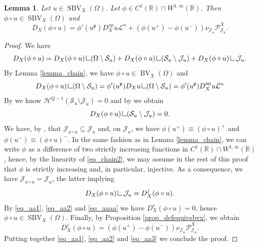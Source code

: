 \documentclass[12pt,a4paper]{amsart}
\theoremstyle{definition}
\theoremstyle{plain}
\newtheorem{lem}[defi]{Lemma}
\newcommand{\R}{\mathbb{R}}
\newcommand{\se}{\subseteq}
\newcommand{\pxu}{{\mathcal{P}^X_{\mathcal{J}_u}}}
\newcommand{\res} {\mathop{\hbox{\vrule height 7pt width .5pt depth 0pt \vrule height .5pt width 6pt depth 0pt}}\nolimits}
\newcommand{\leb}{\mathcal{L}}
\newcommand{\sbv}{\operatorname{SBV}}
\newcommand{\bv}{\operatorname{BV}}
\newcommand{\J}{\mathcal{J}}
\newcommand{\hau}{\mathcal{H}}
\newcommand{\ap}{{\operatorname{ap}}}
\newcommand{\s}{\mathcal{S}}
\newcommand{\p}{{\mathfrak{p}}}
\begin{document}
\begin{lem}\label{lemma_chain2}
     Let $u \in \sbv_X(\Omega)$. Let $\phi \in C^1(\R) \cap W^{1,\infty}(\R)$. Then $\phi \circ u \in \sbv_X(\Omega)$ and
    \begin{equation}\label{eq_chain2}
    D_X(\phi \circ u)=\phi'(u^\p)D^\ap_Xu\leb^n+(\phi(u^+)-\phi(u^-))\nu_{\J_u}\mathcal{P}^X_{\J_u}.
    \end{equation}
\end{lem}
\begin{proof}
We have   \[
    D_X(\phi \circ u)=D_X(\phi \circ u)\res( \Omega \setminus \s_u)+D_X(\phi \circ u) \res (\s_u \setminus \J_u)+D_X(\phi \circ u) \res \J_u.
    \]
    By Lemma \ref{lemma_chain}, we have $\phi \circ u \in \bv_X(\Omega)$ and
    \begin{equation}\label{eq_aa1}
    D_X(\phi \circ u) \res (\Omega \setminus \s_u) =\phi'(u^\p) D_Xu \res (\Omega \setminus \s_u)= \phi'(u^\p)D^\ap_Xu\leb^n
    \end{equation}
    By \cite[Theorem 1.5]{dv} we know $\hau^{Q-1}(\s_u \setminus \J_u )=0$ and by \cite[Theorem 1.3 (ii)]{dv} we obtain 
        \begin{equation}\label{eq_aa2}
    D_X(\phi \circ u) \res (\s_u \setminus \J_u)=0.
  \end{equation}
    We have, by \cite[Proposition 2.28 (ii)]{dv}, that $\J_{\phi \circ u} \se \J_u$ and, on $\J_u$, we have $\phi(u^+) \equiv (\phi \circ u)^+$ and $\phi(u^-) \equiv (\phi \circ u)^-$.  In the same fashion as in Lemma \ref{lemma_chain}, we can write $\phi$ as a difference of two strictly increasing functions in $C^1(\R) \cap W^{1,\infty}(\R)$, hence, by the linearity of \eqref{eq_chain2}, we may assume in the rest of this proof that $\phi$ is strictly increasing and, in particular, injective. As a consequence, we have $\J_{\phi \circ u}=\J_u$, the latter implying
        \begin{equation}\label{eq_aaaa}
    D_X(\phi \circ u)\res \J_u =D^j_X (\phi \circ u).
    \end{equation}   
 By \eqref{eq_aa1}, \eqref{eq_aa2} and \eqref{eq_aaaa} we have $D^c_X(\phi \circ u) =0$, hence $\phi \circ u \in \sbv_X(\Omega)$. Finally, by Proposition \ref{prop_defequivsbvx}, we obtain 
   \begin{equation}\label{eq_aa3}
   D^j_X (\phi \circ u)=(\phi(u^+)-\phi(u^-))\nu_{\J_u}\pxu.
   \end{equation}
 Putting together \eqref{eq_aa1}, \eqref{eq_aa2} and \eqref{eq_aa3} we conclude the proof.
 \end{proof}
\end{document}
